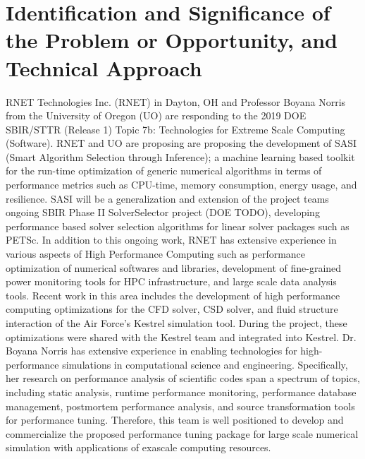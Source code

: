 \section{Identification and Significance of the Problem or Opportunity, and Technical Approach}

RNET Technologies Inc. (RNET) in Dayton, OH and Professor Boyana Norris from the University of Oregon (UO) are responding to the 2019 DOE 
SBIR/STTR (Release 1) Topic 7b: Technologies for Extreme Scale Computing (Software). RNET and UO are proposing are proposing the development of SASI (Smart Algorithm Selection through Inference); a machine learning based toolkit for the run-time optimization of generic numerical algorithms in terms of performance metrics such as CPU-time, memory consumption, energy usage, and resilience. SASI will be a generalization and extension of the project teams ongoing SBIR Phase II SolverSelector project (DOE TODO), developing performance based solver selection algorithms for linear solver packages such as PETSc. In addition to this ongoing work, RNET has extensive experience in various aspects of High Performance Computing such as performance 
optimization of numerical softwares and libraries, development of fine-grained power monitoring tools 
for HPC infrastructure, and large scale data analysis tools. Recent work in this area includes the 
development of high performance computing optimizations for the CFD solver, CSD solver, and fluid
structure interaction of the Air Force's Kestrel simulation tool. During the project, these optimizations
were shared with the Kestrel team and integrated into Kestrel. Dr. Boyana Norris has extensive experience 
in enabling technologies for high-performance simulations in computational science and engineering. 
Specifically, her research on performance analysis of scientific codes span a spectrum of topics, 
including static analysis, runtime performance monitoring, performance database management, postmortem 
performance analysis, and source transformation tools for performance tuning. Therefore, 
this team is well positioned to develop and commercialize the proposed performance tuning package for 
large scale numerical simulation with applications of exascale computing resources. 


